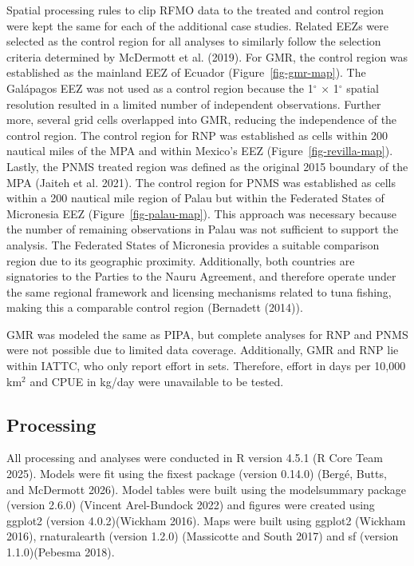 \documentclass[
  letterpaper,
  DIV=11,
  numbers=noendperiod]{scrartcl}
\begin{document}
Spatial processing rules to clip RFMO data to the treated and control
region were kept the same for each of the additional case studies.
Related EEZs were selected as the control region for all analyses to
similarly follow the selection criteria determined by McDermott et al.
(2019). For GMR, the control region was established as the mainland EEZ
of Ecuador (Figure~\ref{fig-gmr-map}). The Galápagos EEZ was not used as
a control region because the 1\(^\circ\) × 1\(^\circ\) spatial
resolution resulted in a limited number of independent observations.
Further more, several grid cells overlapped into GMR, reducing the
independence of the control region. The control region for RNP was
established as cells within 200 nautical miles of the MPA and within
Mexico's EEZ (Figure~\ref{fig-revilla-map}). Lastly, the PNMS treated
region was defined as the original 2015 boundary of the MPA (Jaiteh et
al. 2021). The control region for PNMS was established as cells within a
200 nautical mile region of Palau but within the Federated States of
Micronesia EEZ (Figure~\ref{fig-palau-map}). This approach was necessary
because the number of remaining observations in Palau was not sufficient
to support the analysis. The Federated States of Micronesia provides a
suitable comparison region due to its geographic proximity.
Additionally, both countries are signatories to the Parties to the Nauru
Agreement, and therefore operate under the same regional framework and
licensing mechanisms related to tuna fishing, making this a comparable
control region (Bernadett (2014)).

GMR was modeled the same as PIPA, but complete analyses for RNP and PNMS
were not possible due to limited data coverage. Additionally, GMR and
RNP lie within IATTC, who only report effort in sets. Therefore, effort
in days per 10,000 km\(^2\) and CPUE in kg/day were unavailable to be
tested.

\subsection{Processing}\label{processing}

All processing and analyses were conducted in R version 4.5.1 (R Core
Team 2025). Models were fit using the fixest package (version 0.14.0)
(Bergé, Butts, and McDermott 2026). Model tables were built using the
modelsummary package (version 2.6.0) (Vincent Arel-Bundock 2022) and
figures were created using ggplot2 (version 4.0.2)(Wickham 2016). Maps
were built using ggplot2 (Wickham 2016), rnaturalearth (version 1.2.0)
(Massicotte and South 2017) and sf (version 1.1.0)(Pebesma 2018).
\end{document}
